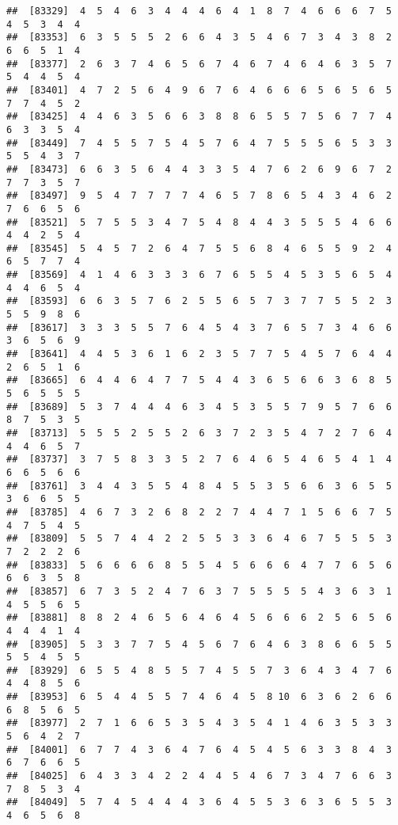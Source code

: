 \documentclass[
]{book}
\begin{document}
\begin{verbatim}
##  [83329]  4  5  4  6  3  4  4  4  6  4  1  8  7  4  6  6  6  7  5  4  5  3  4  4
##  [83353]  6  3  5  5  5  2  6  6  4  3  5  4  6  7  3  4  3  8  2  6  6  5  1  4
##  [83377]  2  6  3  7  4  6  5  6  7  4  6  7  4  6  4  6  3  5  7  5  4  4  5  4
##  [83401]  4  7  2  5  6  4  9  6  7  6  4  6  6  6  5  6  5  6  5  7  7  4  5  2
##  [83425]  4  4  6  3  5  6  6  3  8  8  6  5  5  7  5  6  7  7  4  6  3  3  5  4
##  [83449]  7  4  5  5  7  5  4  5  7  6  4  7  5  5  5  6  5  3  3  5  5  4  3  7
##  [83473]  6  6  3  5  6  4  4  3  3  5  4  7  6  2  6  9  6  7  2  7  7  3  5  7
##  [83497]  9  5  4  7  7  7  7  4  6  5  7  8  6  5  4  3  4  6  2  7  6  6  5  6
##  [83521]  5  7  5  5  3  4  7  5  4  8  4  4  3  5  5  5  4  6  6  4  4  2  5  4
##  [83545]  5  4  5  7  2  6  4  7  5  5  6  8  4  6  5  5  9  2  4  6  5  7  7  4
##  [83569]  4  1  4  6  3  3  3  6  7  6  5  5  4  5  3  5  6  5  4  4  4  6  5  4
##  [83593]  6  6  3  5  7  6  2  5  5  6  5  7  3  7  7  5  5  2  3  5  5  9  8  6
##  [83617]  3  3  3  5  5  7  6  4  5  4  3  7  6  5  7  3  4  6  6  3  6  5  6  9
##  [83641]  4  4  5  3  6  1  6  2  3  5  7  7  5  4  5  7  6  4  4  2  6  5  1  6
##  [83665]  6  4  4  6  4  7  7  5  4  4  3  6  5  6  6  3  6  8  5  5  6  5  5  5
##  [83689]  5  3  7  4  4  4  6  3  4  5  3  5  5  7  9  5  7  6  6  8  7  5  3  5
##  [83713]  5  5  5  2  5  5  2  6  3  7  2  3  5  4  7  2  7  6  4  4  4  6  5  7
##  [83737]  3  7  5  8  3  3  5  2  7  6  4  6  5  4  6  5  4  1  4  6  6  5  6  6
##  [83761]  3  4  4  3  5  5  4  8  4  5  5  3  5  6  6  3  6  5  5  3  6  6  5  5
##  [83785]  4  6  7  3  2  6  8  2  2  7  4  4  7  1  5  6  6  7  5  4  7  5  4  5
##  [83809]  5  5  7  4  4  2  2  5  5  3  3  6  4  6  7  5  5  5  3  7  2  2  2  6
##  [83833]  5  6  6  6  6  8  5  5  4  5  6  6  6  4  7  7  6  5  6  6  6  3  5  8
##  [83857]  6  7  3  5  2  4  7  6  3  7  5  5  5  5  4  3  6  3  1  4  5  5  6  5
##  [83881]  8  8  2  4  6  5  6  4  6  4  5  6  6  6  2  5  6  5  6  4  4  4  1  4
##  [83905]  5  3  3  7  7  5  4  5  6  7  6  4  6  3  8  6  6  5  5  5  5  4  5  5
##  [83929]  6  5  5  4  8  5  5  7  4  5  5  7  3  6  4  3  4  7  6  4  4  8  5  6
##  [83953]  6  5  4  4  5  5  7  4  6  4  5  8 10  6  3  6  2  6  6  6  8  5  6  5
##  [83977]  2  7  1  6  6  5  3  5  4  3  5  4  1  4  6  3  5  3  3  5  6  4  2  7
##  [84001]  6  7  7  4  3  6  4  7  6  4  5  4  5  6  3  3  8  4  3  6  7  6  6  5
##  [84025]  6  4  3  3  4  2  2  4  4  5  4  6  7  3  4  7  6  6  3  7  8  5  3  4
##  [84049]  5  7  4  5  4  4  4  3  6  4  5  5  3  6  3  6  5  5  3  4  6  5  6  8

\end{verbatim}
\end{document}

